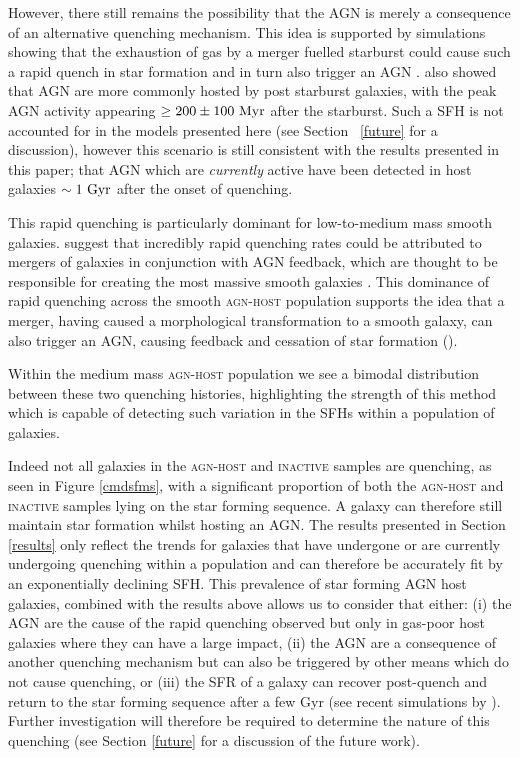 However, there still remains the possibility that the AGN is merely a consequence of an alternative quenching mechanism. This idea is supported by simulations showing that the exhaustion of gas by a merger fuelled starburst could cause such a rapid quench in star formation and in turn also trigger an AGN \citep{Croton06, Wild09, Snyder11, Hayward14}. \citet{Yesuf14} also showed that AGN are more commonly hosted by post starburst galaxies, with the peak AGN activity appearing $\geq 200 \pm 100 ~\rm{Myr}$ after the starburst. Such a SFH is not accounted for in the models presented here (see Section ~\ref{future} for a discussion), however this scenario is still consistent with the results presented in this paper; that AGN which are \emph{currently} active have been detected in host galaxies $\sim 1~\rm{Gyr}$ after the onset of quenching.

This rapid quenching is particularly dominant for low-to-medium mass smooth galaxies. \cite{smethurst15} suggest that incredibly rapid quenching rates could be attributed to mergers of galaxies in conjunction with AGN feedback, which are thought to be responsible for creating the most massive smooth galaxies \citep{conselice03b, springel05b, hopkins08b}. This dominance of rapid quenching across the smooth \textsc{agn-host} population supports the idea that a merger, having caused a morphological transformation to a smooth galaxy, can also trigger an AGN, causing feedback and cessation of star formation (\citealt{Sanders88, pontzen16}).

Within the medium mass \textsc{agn-host} population we see a bimodal distribution between these two quenching histories, highlighting the strength of this method which is capable of detecting such variation in the SFHs within a population of galaxies. 

Indeed not all galaxies in the \textsc{agn-host} and \textsc{inactive} samples are quenching, as seen in Figure \ref{cmdsfms}, with a significant proportion of both the \textsc{agn-host} and \textsc{inactive} samples lying on the star forming sequence. A galaxy can therefore still maintain star formation whilst hosting an AGN. The results presented in Section \ref{results} only reflect the trends for galaxies that have undergone or are currently undergoing quenching within a population and can therefore be accurately fit by an exponentially declining SFH. This prevalence of star forming AGN host galaxies, combined with the results above allows us to consider that either: (i)  the AGN are the cause of the rapid quenching observed but only in gas-poor host galaxies where they can have a large impact, (ii) the AGN are a consequence of another quenching mechanism but can also be triggered by other means which do not cause quenching, or (iii) the SFR of a galaxy can recover post-quench and return to the star forming sequence after a few Gyr (see recent simulations by \citealt{pontzen16}). Further investigation will therefore be required to determine the nature of this quenching (see Section \ref{future} for a discussion of the future work).

